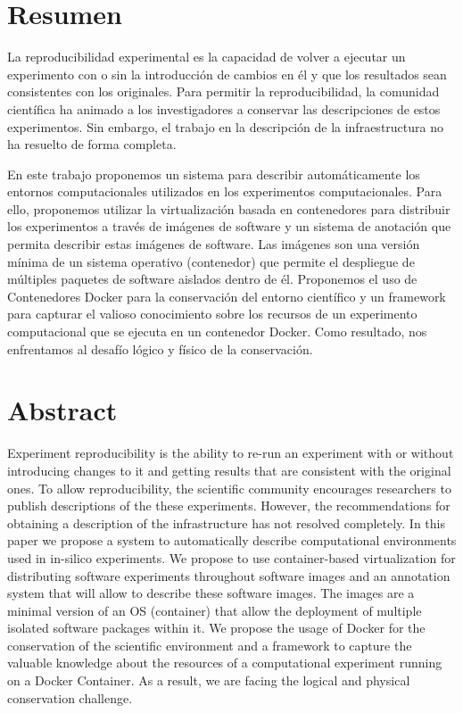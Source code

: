 

\section*{Resumen}

La reproducibilidad experimental es la capacidad de volver a ejecutar un experimento con o sin la introducción de cambios en él y que los resultados sean consistentes con los originales. 
Para permitir la reproducibilidad, la comunidad científica ha animado a los investigadores a conservar las descripciones de estos experimentos. 
Sin embargo, el trabajo en la descripción de la infraestructura no ha resuelto de forma completa.

En este trabajo proponemos un sistema para describir automáticamente los entornos computacionales utilizados en los experimentos computacionales. 
Para ello, proponemos utilizar la virtualización basada en contenedores para distribuir los experimentos a través de imágenes de software y un sistema de anotación que permita describir estas imágenes de software. 
Las imágenes son una versión mínima de un sistema operativo (contenedor) que permite el despliegue de múltiples paquetes de software aislados dentro de él. 
Proponemos el uso de Contenedores Docker para la conservación del entorno científico y un framework para capturar el valioso conocimiento sobre los recursos de un experimento computacional que se ejecuta en un contenedor Docker.
Como resultado, nos enfrentamos al desafío lógico y físico de la conservación. 
 \newpage
\section*{Abstract}
% 
Experiment reproducibility is the ability to re-run an experiment with or without introducing changes to it and getting results that are consistent with the original ones. 
To allow reproducibility, the scientific community encourages researchers to publish descriptions of the these experiments. 
However, the recommendations for obtaining a description of the infrastructure has not resolved completely.
In this paper we propose a system to automatically describe computational environments used in in-silico experiments. We propose to use container-based virtualization for distributing software experiments throughout software images and an annotation system that will allow to describe these software images. The images are a minimal version of an OS (container) that allow the deployment of multiple isolated software packages within it. 
We propose the usage of Docker for the conservation of the scientific environment and a framework to capture the valuable knowledge about the resources of a computational experiment running on a Docker Container. As a result, we are facing the logical and physical conservation challenge. 